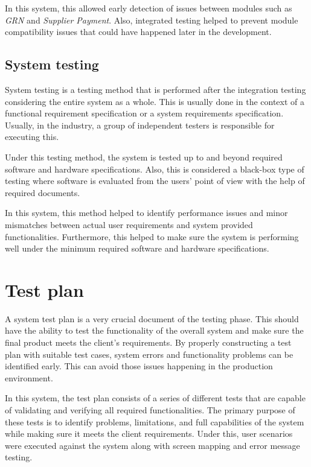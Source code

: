 \documentclass[12pt]{report}
\begin{document}
In this system, this allowed early detection of issues between modules such as {\it{GRN}} and {\it{Supplier Payment}}. Also, integrated testing helped to prevent module compatibility issues that could have happened later in the development.

\subsection{System testing}
System testing is a testing method that is performed after the integration testing considering the entire system as a whole. This is usually done in the context of a functional requirement specification or a system requirements specification. Usually, in the industry, a group of independent testers is responsible for executing this.

Under this testing method, the system is tested up to and beyond required software and hardware specifications. Also, this is considered a black-box type of testing where software is evaluated from the users' point of view with the help of required documents.

In this system, this method helped to identify performance issues and minor mismatches between actual user requirements and system provided functionalities. Furthermore, this helped to make sure the system is performing well under the minimum required software and hardware specifications.

\section{Test plan}
A system test plan is a very crucial document of the testing phase. This should have the ability to test the functionality of the overall system and make sure the final product meets the client's requirements. By properly constructing a test plan with suitable test cases, system errors and functionality problems can be identified early. This can avoid those issues happening in the production environment.

In this system, the test plan consists of a series of different tests that are capable of validating and verifying all required functionalities. The primary purpose of these tests is to identify problems, limitations, and full capabilities of the system while making sure it meets the client requirements. Under this, user scenarios were executed against the system along with screen mapping and error message testing.
\end{document}
